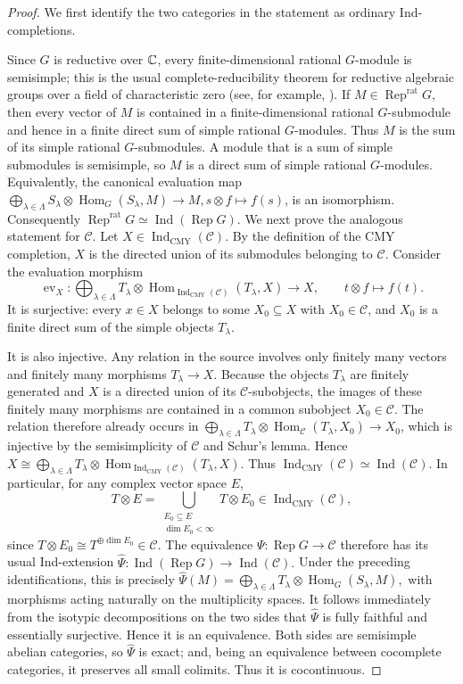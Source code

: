 \documentclass[10pt,a4paper]{amsart}
\numberwithin{equation}{section} \newtheorem{thm}{Theorem}[section] \newtheorem{lem}[thm]{Lemma} \newtheorem{ex}[thm]{Example} \newtheorem{prop}[thm]{Proposition} \newtheorem{cor}[thm]{Corollary} \newtheorem{defi}[thm]{Definition} \newtheorem{rmk}[thm]{Remark} \newtheorem{notation}[thm]{Notation}
\newcommand{\Ind}{\operatorname{Ind}}
\newcommand{\Rep}{\operatorname{Rep}}
\newcommand{\Hom}{\operatorname{Hom}}
\newcommand{\IndCMY}{\operatorname{Ind}_{\mathrm{CMY}}}
\begin{document}
\begin{proof}
We first identify the two categories in the statement as ordinary Ind-completions.

Since $G$ is reductive over $\mathbb{C}$, every finite-dimensional rational $G$-module is semisimple; this is the usual complete-reducibility theorem for reductive algebraic groups over a field of characteristic zero (see, for example, \cite{SpringerLAG}). If $M\in\Rep^{\mathrm{rat}}G$, then every vector of $M$ is contained in a finite-dimensional rational $G$-submodule and hence in a finite direct sum of simple rational $G$-modules. Thus $M$ is the sum of its simple rational $G$-submodules. A module that is a sum of simple submodules is semisimple, so $M$ is a direct sum of simple rational $G$-modules. Equivalently, the canonical evaluation map \(\bigoplus_{\lambda\in\Lambda} S_\lambda\otimes\Hom_G(S_\lambda,M) \longrightarrow M, s\otimes f\longmapsto f(s)\), is an isomorphism. Consequently \(\Rep^{\mathrm{rat}}G\simeq\Ind(\Rep G).\) We next prove the analogous statement for $\mathcal C$. Let $X\in\IndCMY(\mathcal C)$. By the definition of the CMY completion, $X$ is the directed union of its submodules belonging to $\mathcal C$. Consider the evaluation morphism
\[
\operatorname{ev}_X:
\bigoplus_{\lambda\in\Lambda}
T_\lambda\otimes
\Hom_{\IndCMY(\mathcal C)}(T_\lambda,X)
\longrightarrow X,
\qquad
t\otimes f\longmapsto f(t).
\]
It is surjective: every $x\in X$ belongs to some $X_0\subseteq X$ with $X_0\in\mathcal C$, and $X_0$ is a finite direct sum of the simple objects $T_\lambda$.

It is also injective. Any relation in the source involves only finitely many vectors and finitely many morphisms $T_\lambda\to X$. Because the objects $T_\lambda$ are finitely generated and $X$ is a directed union of its $\mathcal C$-subobjects, the images of these finitely many morphisms are contained in a common subobject $X_0\in\mathcal C$. The relation therefore already occurs in \(\bigoplus_{\lambda\in\Lambda} T_\lambda\otimes\Hom_{\mathcal C}(T_\lambda,X_0) \longrightarrow X_0\), which is injective by the semisimplicity of $\mathcal C$ and Schur's lemma. Hence \(X\cong\bigoplus_{\lambda\in\Lambda}T_\lambda\otimes\Hom_{\IndCMY(\mathcal C)}(T_\lambda,X)\). Thus \(\IndCMY(\mathcal C)\simeq\Ind(\mathcal C).\) In particular, for any complex vector space $E$,
\[
T\otimes E
=
\bigcup_{\substack{E_0\subseteq E\\ \dim E_0<\infty}}
T\otimes E_0
\in\IndCMY(\mathcal C),
\]
since $T\otimes E_0\cong T^{\oplus\dim E_0}\in\mathcal C$. The equivalence $\Psi:\Rep G\to\mathcal C$ therefore has its usual Ind-extension \(\widehat\Psi:\Ind(\Rep G)\longrightarrow\Ind(\mathcal C).\) Under the preceding identifications, this is precisely \(\widehat\Psi(M)=\bigoplus_{\lambda\in\Lambda}T_\lambda\otimes\Hom_G(S_\lambda,M),\) with morphisms acting naturally on the multiplicity spaces. It follows immediately from the isotypic decompositions on the two sides that $\widehat\Psi$ is fully faithful and essentially surjective. Hence it is an equivalence. Both sides are semisimple abelian categories, so $\widehat\Psi$ is exact; and, being an equivalence between cocomplete categories, it preserves all small colimits. Thus it is cocontinuous.


\end{proof}
\end{document}
